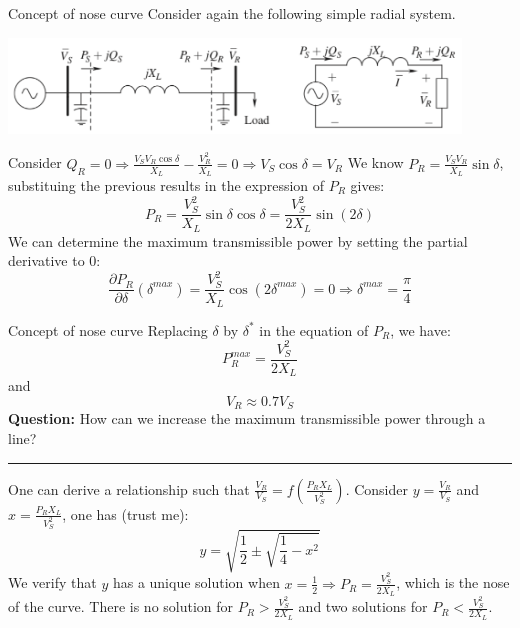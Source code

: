 \begin{frame}{Concept of nose curve}
Consider again the following simple radial system.
\begin{center}
\includegraphics[width=0.9\textwidth]{images/RadialSystem.png}
\end{center}
Consider $Q_R = 0 \Rightarrow \frac{V_S V_R \cos \delta}{X_L} - \frac{V^2_R}{X_L} = 0 \Rightarrow V_S \cos \delta = V_R$
We know $P_R = \frac{V_SV_R}{X_L}\sin \delta$, substituing the previous results in the expression of $P_R$ gives:
$$P_R = \frac{V_S^2}{X_L}\sin \delta \cos \delta = \frac{V_S^2}{2 X_L}\sin (2\delta)$$
We can determine the maximum transmissible power by setting the partial derivative to 0:
$$\frac{\partial P_R}{\partial \delta}(\delta^{max}) = \frac{V_S^2}{X_L}\cos (2\delta^{max}) = 0 \Rightarrow \delta^{max} = \frac{\pi}{4}$$
\end{frame}

\begin{frame}{Concept of nose curve}
Replacing $\delta$ by $\delta^*$ in the equation of $P_R$, we have:
$$P_{R}^{max} = \frac{V_S^2}{2 X_L}$$
and
$$V_R \approx 0.7 V_S$$
\textbf{Question:} How can we increase the maximum transmissible power through a line?
\hrule
One can derive a relationship such that $\frac{V_R}{V_S} = f(\frac{P_R X_L}{V_S^2})$. Consider $y = \frac{V_R}{V_S}$ and $x = \frac{P_R X_L}{V_S^2}$, one has (trust me):
$$y = \sqrt{\frac{1}{2}\pm \sqrt{\frac{1}{4}-x^2}}$$
We verify that $y$ has a unique solution when $x = \frac{1}{2} \Rightarrow P_R = \frac{V_S^2}{2 X_L}$, which is the nose of the curve. There is no solution for $P_R > \frac{V_S^2}{2 X_L}$ and two solutions for $P_R < \frac{V_S^2}{2 X_L}$.
\end{frame}


